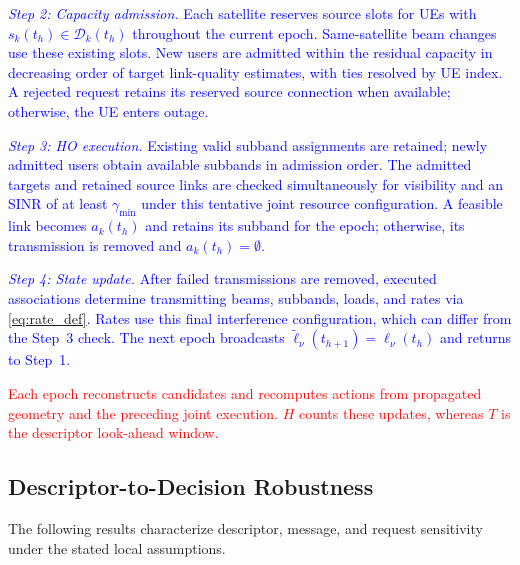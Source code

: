 \documentclass[10pt,letterpaper,journal]{IEEEtran}
\newcommand{\revnew}[1]{\textcolor{red}{#1}}
\begin{document}
\textcolor{blue}{
\textit{Step 2: Capacity admission.}
Each satellite reserves source slots for UEs with $s_k(t_h)\in\mathcal D_k(t_h)$ throughout the current epoch.
Same-satellite beam changes use these existing slots. 
New users are admitted within the residual capacity in decreasing order of target link-quality estimates, with ties resolved by UE index.
A rejected request retains its reserved source connection when available; otherwise, the UE enters outage.
}

\textcolor{blue}{
\textit{Step 3: HO execution.}
Existing valid subband assignments are retained; newly admitted users obtain available subbands in admission order. The admitted targets and retained source links are checked simultaneously for visibility and an SINR of at least $\gamma_{\min}$ under this tentative joint resource configuration.
A feasible link becomes $a_k(t_h)$ and retains its subband for the epoch; otherwise, its transmission is removed and $a_k(t_h)=\emptyset$.
}

\textcolor{blue}{
\textit{Step 4: State update.}
After failed transmissions are removed, executed associations determine transmitting beams, subbands, loads, and rates via \eqref{eq:rate_def}. Rates use this final interference configuration, which can differ from the Step~3 check. The next epoch broadcasts $\tilde\ell_\nu(t_{h+1})=\ell_\nu(t_h)$ and returns to Step~1.
}

\revnew{Each epoch reconstructs candidates and recomputes actions from propagated geometry and the preceding joint execution. $H$ counts these updates, whereas $T$ is the descriptor look-ahead window.}

\vspace{-4mm}
\begingroup\color{red}
\subsection{Descriptor-to-Decision Robustness}
\label{subsec:risk_decision_robustness}
The following results characterize descriptor, message, and request sensitivity under the stated local assumptions.
\end{document}
